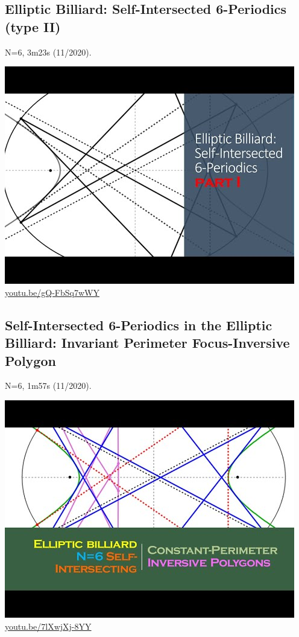 \documentclass[12pt]{amsart}
\begin{document}
\subsection{Elliptic Billiard: Self-Intersected 6-Periodics (type II)}
\label{vid:gQ-FbSq7wWY}
\noindent N=6, 3m23s (11/2020). 
\begin{center}\includegraphics[width=.5\textwidth]{pics/gQ-FbSq7wWY.jpg} \\ 
\href{https://youtu.be/gQ-FbSq7wWY}{\url{youtu.be/gQ-FbSq7wWY}}\end{center}
% 

\subsection{Self-Intersected 6-Periodics in the Elliptic Billiard: Invariant Perimeter Focus-Inversive Polygon}
\label{vid:7lXwjXj-8YY}
\noindent N=6, 1m57s (11/2020). 
\begin{center}\includegraphics[width=.5\textwidth]{pics/7lXwjXj-8YY.jpg} \\ 
\href{https://youtu.be/7lXwjXj-8YY}{\url{youtu.be/7lXwjXj-8YY}}\end{center}
% 
\end{document}
